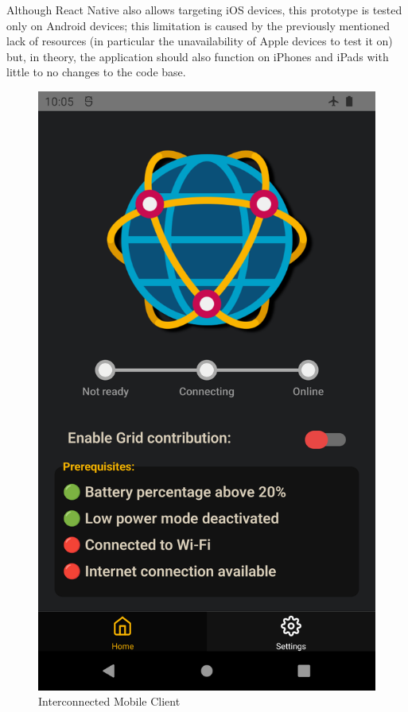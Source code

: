Although React Native also allows targeting iOS devices, this prototype is tested only on Android devices; this limitation is caused by the previously mentioned lack of resources (in particular the unavailability of Apple devices to test it on) but, in theory, the application should also function on iPhones and iPads with little to no changes to the code base.

\begin{figure}[!ht]
    \centering
    \includegraphics[scale=0.14]{document/chapters/chapter_7/images/interconnected_mobile_home.png}
    \caption{Interconnected Mobile Client}
    \label{fig:interconnected_mobile_home}
\end{figure}

